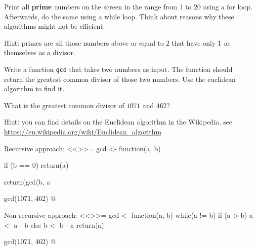 \documentclass
[answers]
{exercise_sheet}
\begin{document}
\begin{Question}{12}
Print all \textbf{prime} numbers on the screen in the range from 1 to 20 using a for loop. Afterwards, do the same using a while loop. Think about reasons why these algorithms might not be efficient.

Hint: primes are all those numbers above or equal to $2$ that have only $1$ or themselves as a divisor. 
\end{Question}

\makeatletter\if@answers{}\fi\makeatother

\begin{Question}{6}
Write a function \verb|gcd| that takes two numbers as input. The function should return the greatest common divisor of those two numbers. Use the euclidean algorithm to find it.

What is the greatest common divisor of $1071$ and $462$?

Hint: you can find details on the Euclidean algorithm in the Wikipedia, see \url{https://en.wikipedia.org/wiki/Euclidean_algorithm}
\end{Question}

\makeatletter\if@answers\begin{Answer}{10}
Recursive approach:
<<>>=
gcd <- function(a, b) {
  if (b == 0) { 
    return(a)
  }
  
  return(gcd(b, a %
}

gcd(1071, 462)
@

Non-recursive approach:
<<>>=
gcd <- function(a, b) {
  while(a != b) {
    if (a > b) {
  	  a <- a - b
  	} else {
  	  b <- b - a
  	}
  }
  return(a)
}

gcd(1071, 462)
@
\end{Answer}\fi\makeatother
\end{document}
